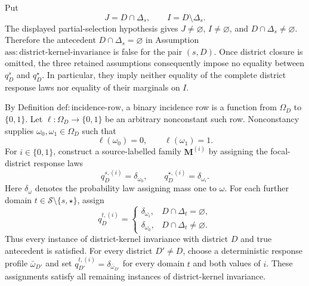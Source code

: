 Put
\[
J=D\cap\Delta_s,
\qquad
I=D\setminus\Delta_s.
\]
The displayed partial-selection hypothesis gives \(J\ne\varnothing\), \(I\ne\varnothing\), and \(D\cap\Delta_s\ne\varnothing\).  Therefore the antecedent \(D\cap\Delta_s=\varnothing\) in Assumption \(\mathrm{ass:district\text{-}kernel\text{-}invariance}\) is false for the pair \((s,D)\).  Once district closure is omitted, the three retained assumptions consequently impose no equality between \(q_D^s\) and \(q_D^\star\).  In particular, they imply neither equality of the complete district response laws nor equality of their marginals on \(I\).

By Definition \(\mathrm{def:incidence\text{-}row}\), a binary incidence row is a function from \(\Omega_D\) to \(\{0,1\}\).  Let \(\ell:\Omega_D\to\{0,1\}\) be an arbitrary nonconstant such row.  Nonconstancy supplies \(\omega_0,\omega_1\in\Omega_D\) such that
\[
\ell(\omega_0)=0,
\qquad
\ell(\omega_1)=1.
\tag{1}
\]
For \(i\in\{0,1\}\), construct a source-labelled family \(\mathbf M^{(i)}\) by assigning the focal-district response laws
\[
q_D^{s,(i)}=\delta_{\omega_0},
\qquad
q_D^{\star,(i)}=\delta_{\omega_i}.
\tag{2}
\]
Here \(\delta_\omega\) denotes the probability law assigning mass one to \(\omega\).
For each further domain \(t\in\mathcal S\setminus\{s,\star\}\), assign
\[
q_D^{t,(i)}=
\begin{cases}
\delta_{\omega_i},&D\cap\Delta_t=\varnothing,\\
\delta_{\omega_0},&D\cap\Delta_t\ne\varnothing.
\end{cases}
\tag{3}
\]
Thus every instance of district-kernel invariance with district \(D\) and true antecedent is satisfied.  For every district \(D'\ne D\), choose a deterministic response profile \(\bar\omega_{D'}\) and set \(q_{D'}^{t,(i)}=\delta_{\bar\omega_{D'}}\) for every domain \(t\) and both values of \(i\).  These assignments satisfy all remaining instances of district-kernel invariance.

